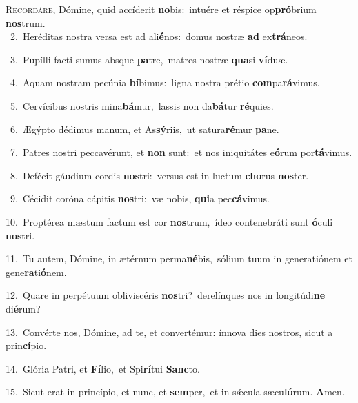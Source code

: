 \lettrine{\initial\textcolor{\initialcolor}{R}}{ecordáre,} Dómine, quid accíderit \textbf{no}\-bis:~\star intuére et réspice op\-\textbf{pró}\-brium \textbf{nos}\-trum.\\
{\numbfont\textcolor{\numbcolor}{~2.}}~Heréditas nostra versa est ad ali\-\textbf{é}\-nos:~\star domus nostræ \textbf{ad} ex\-\textbf{trá}\-neos.\par
{\numbfont\textcolor{\numbcolor}{~3.}}~Pupílli facti sumus absque \textbf{pa}\-tre,~\star matres nostræ \textbf{qua}\-si \textbf{ví}\-duæ.\par
{\numbfont\textcolor{\numbcolor}{~4.}}~Aquam nostram pecúnia \textbf{bí}\-bimus:~\star ligna nostra prétio \textbf{com}\-pa\-\textbf{rá}\-vimus.\par
{\numbfont\textcolor{\numbcolor}{~5.}}~Cervícibus nostris mina\-\textbf{bá}\-mur,~\star lassis non da\-\textbf{bá}\-tur \textbf{ré}\-quies.\par
{\numbfont\textcolor{\numbcolor}{~6.}}~Ægýpto dédimus manum, et As\-\textbf{sý}\-riis,~\star ut satura\-\textbf{ré}\-mur \textbf{pa}\-ne.\par
{\numbfont\textcolor{\numbcolor}{~7.}}~Patres nostri peccavérunt, et \textbf{non} sunt:~\star et nos iniquitátes e\-\textbf{ó}\-rum por\-\textbf{tá}\-vimus.\par
{\numbfont\textcolor{\numbcolor}{~8.}}~Defécit gáudium cordis \textbf{nos}\-tri:~\star versus est in luctum \textbf{cho}\-rus \textbf{nos}\-ter.\par
{\numbfont\textcolor{\numbcolor}{~9.}}~Cécidit coróna cápitis \textbf{nos}\-tri:~\star væ nobis, \textbf{qui}\-a pec\-\textbf{cá}\-vimus.\par
{\numbfont\textcolor{\numbcolor}{10.}}~Proptérea mæstum factum est cor \textbf{nos}\-trum,~\star ídeo contenebráti sunt \textbf{ó}\-culi \textbf{nos}\-tri.\par
{\numbfont\textcolor{\numbcolor}{11.}}~Tu autem, Dómine, in ætérnum perma\-\textbf{né}\-bis,~\star sólium tuum in generatiónem et gene\-\textbf{ra}\-ti\-\textbf{ó}\-nem.\par
{\numbfont\textcolor{\numbcolor}{12.}}~Quare in perpétuum obliviscéris \textbf{nos}\-tri?~\star derelínques nos in longitúdi\textbf{ne} di\-\textbf{é}\-rum?\par
{\numbfont\textcolor{\numbcolor}{13.}}~Convérte nos, Dómine, ad te, et convertémur: ínnova dies nostros, sicut a prin\-\textbf{cí}\-pio.\par
{\numbfont\textcolor{\numbcolor}{14.}}~Glória Patri, et \textbf{Fí}\-lio,~\star et Spi\-\textbf{rí}\-tui \textbf{Sanc}\-to.\par
{\numbfont\textcolor{\numbcolor}{15.}}~Sicut erat in princípio, et nunc, et \textbf{sem}\-per,~\star et in sǽcula sæcu\-\textbf{ló}\-rum. \textbf{A}\-men.\par

